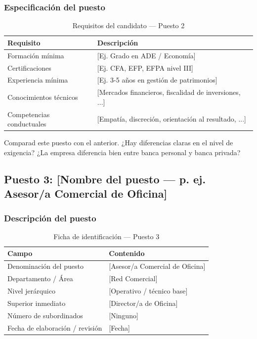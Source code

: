 \subsubsection{Especificación del puesto}

\begin{table}[H]
  \centering
  \small
  \caption{Requisitos del candidato — Puesto 2}
  \begin{tabularx}{\textwidth}{lX}
    \toprule
    \textbf{Requisito}       & \textbf{Descripción} \\
    \midrule
    Formación mínima         & [Ej. Grado en ADE / Economía] \\
    Certificaciones          & [Ej. CFA, EFP, EFPA nivel III] \\
    Experiencia mínima       & [Ej. 3-5 años en gestión de patrimonios] \\
    Conocimientos técnicos   & [Mercados financieros, fiscalidad de inversiones, ...] \\
    Competencias conductuales & [Empatía, discreción, orientación al resultado, ...] \\
    \bottomrule
  \end{tabularx}
\end{table}

\begin{notaequipo}
  Comparad este puesto con el anterior. ¿Hay diferencias claras en el nivel
  de exigencia? ¿La empresa diferencia bien entre banca personal y banca privada?
\end{notaequipo}

\subsection{Puesto 3: [Nombre del puesto — p. ej. Asesor/a Comercial de Oficina]}

\subsubsection{Descripción del puesto}

\begin{table}[H]
  \centering
  \small
  \caption{Ficha de identificación — Puesto 3}
  \begin{tabularx}{\textwidth}{lX}
    \toprule
    \textbf{Campo}               & \textbf{Contenido} \\
    \midrule
    Denominación del puesto      & [Asesor/a Comercial de Oficina] \\
    Departamento / Área          & [Red Comercial] \\
    Nivel jerárquico             & [Operativo / técnico base] \\
    Superior inmediato           & [Director/a de Oficina] \\
    Número de subordinados       & [Ninguno] \\
    Fecha de elaboración / revisión & [Fecha] \\
    \bottomrule
  \end{tabularx}
\end{table}

